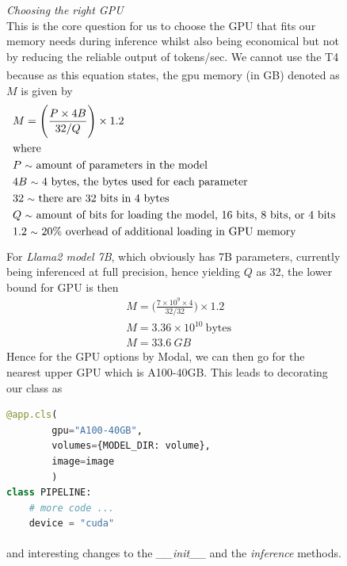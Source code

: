 \documentclass[12pt]{article}
\newcommand{\customtext}[3]{%
    \vspace{#2} %
    \fontsize{13}{8}\textcolor{#1}{\textit{#3}}%
}
\newcommand{\sidecite}[1]{\textsuperscript{\textcolor{blue}{\textbf{\scriptsize#1}}}}
\newcommand{\maincitecount}{\sidecite{\stepcounter{maincite}\themaincite}}
\begin{document}
\begin{figure}[!htb]
    \begin{minipage}[t]{0.65\textwidth}
    \raggedright
    \customtext{xtitle}{0em}{Choosing the right GPU}\\
This is the core question for us to choose the GPU that fits our memory needs during inference whilst also 
being economical but not by reducing the reliable output of tokens/sec. We cannot use the T4 because as this 
equation states{\maincitecount}, the gpu memory (in GB) denoted as $M$ is given by 
\begin{align*}
    & M = \Bigg(\frac{P\times4B}{32/Q}\Bigg)\times1.2\\
    & \text{where}\\
    & P\ \text{\footnotesize $\sim$}\ \text{amount of parameters in the model}\\
    & 4B\ \text{\footnotesize $\sim$}\ \text{4 bytes, the bytes used for each parameter}\\
    & 32\ \text{\footnotesize $\sim$}\ \text{there are 32 bits in 4 bytes}\\
    & Q\ \text{\footnotesize $\sim$}\ \text{amount of bits for loading the model, 16 bits, 8 bits, or 4 bits}\\
    & 1.2\ \text{\footnotesize $\sim$}\ \text{20\% overhead of additional loading in GPU memory}
\end{align*}
For {\it Llama2 model 7B}, which obviously has 7B{\maincitecount} parameters, currently being inferenced at full precision, 
hence yielding $Q$ as 32, the lower bound for GPU is then 
\begin{align*}
    &M=\Bigg(\frac{7\times10^9\times4}{32/32}\Bigg)\times1.2\\
    &M = 3.36\times10^{10}\ \text{bytes}\\
    &M = 33.6\ GB
\end{align*}
Hence for the GPU options by Modal, we can then go for the nearest upper GPU which is A100-40GB. This leads to 
decorating our class as 
\begin{lstlisting}[language=python,style=python,basicstyle=\ttfamily\footnotesize]
@app.cls(
        gpu="A100-40GB", 
        volumes={MODEL_DIR: volume}, 
        image=image
        )
class PIPELINE:
    # more code ...
    device = "cuda"
\end{lstlisting}
and interesting changes to the {\it \footnotesize \_\_init\_\_} and the {\it \footnotesize inference} 
methods{\maincitecount}.
\end{minipage}%
\hspace{25pt}

\end{figure}
\end{document}
